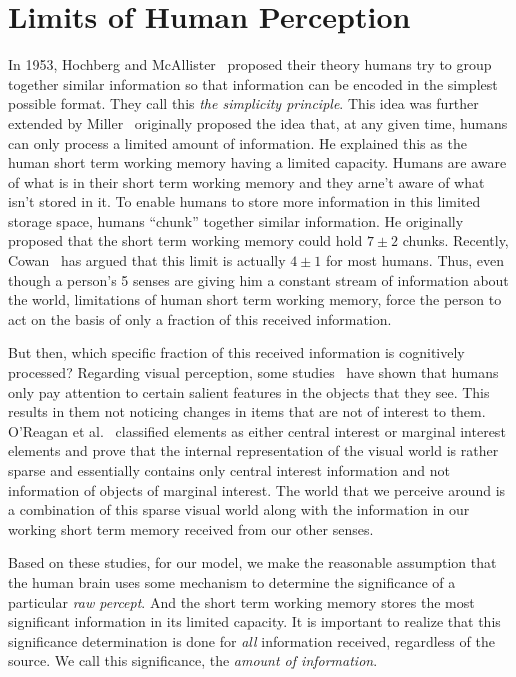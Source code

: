 \section{Limits of Human Perception}
\label{IBP:ReviewPerception}
In 1953, Hochberg and McAllister~\cite{Hochberg:1953eh} proposed their theory humans try to group together similar information so that information can be encoded in the simplest possible format. They call this \emph{the simplicity principle}. This idea was further extended by Miller~\cite{Miller:1956tr} originally proposed the idea that, at any given time, humans can only process a limited amount of information. He explained this as the human short term working memory having a limited capacity. Humans are aware of what is in their short term working memory and they arne't aware of what isn't stored in it. To enable humans to store more information in this limited storage space, humans ``chunk'' together similar information. He originally proposed that the short term working memory could hold $7\pm 2$ chunks. Recently, Cowan~\cite{Cowan:2001wi} has argued that this limit is actually $4\pm 1$ for most humans. Thus, even though a person's 5 senses are giving him a constant stream of information about the world, limitations of human short term working memory, force the person to act on the basis of only a fraction of this received information. 

But then, which specific fraction of this received information is cognitively processed? Regarding visual perception, some studies~\cite{Itti:2001wa,OReagan:1999wj,Triesch:2003vz} have shown that humans only pay attention to certain salient features in the objects that they see. This results in them not noticing changes in items that are not of interest to them. O'Reagan et al.~\cite{OReagan:1999wj} classified elements as either central interest or marginal interest elements and prove that the internal representation of the visual world is rather sparse and essentially contains only central interest information and not information of objects of marginal interest. The world that we perceive around is a combination of this sparse visual world along with the information in our working short term memory received from our other senses. 

Based on these studies, for our model, we make the reasonable assumption that the human brain uses some mechanism to determine the significance of a particular \emph{raw percept}. And the short term working memory stores the most significant information in its limited capacity. It is important to realize that this significance determination is done for \emph{all} information received, regardless of the source. We call this significance, the \emph{amount of information}.

